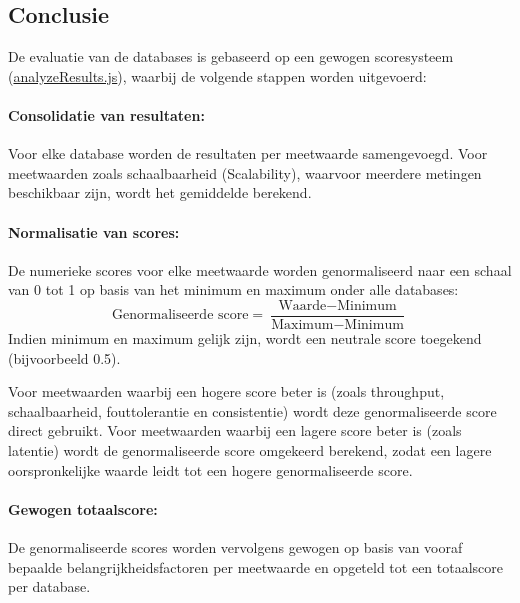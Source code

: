 \subsection{Conclusie}
De evaluatie van de databases is gebaseerd op een gewogen scoresysteem (\href{https://github.com/WoutVC/bachelorproef2024/blob/main/proof_of_concept/backend/analyzeResults.js}{analyzeResults.js}), waarbij de volgende stappen worden uitgevoerd:

\paragraph{Consolidatie van resultaten:} 
Voor elke database worden de resultaten per meetwaarde samengevoegd. Voor meetwaarden zoals schaalbaarheid (Scalability), waarvoor meerdere metingen beschikbaar zijn, wordt het gemiddelde berekend.

\paragraph{Normalisatie van scores:} 
De numerieke scores voor elke meetwaarde worden genormaliseerd naar een schaal van 0 tot 1 op basis van het minimum en maximum onder alle databases:
\[
\text{Genormaliseerde score} = \frac{\text{Waarde} - \text{Minimum}}{\text{Maximum} - \text{Minimum}}
\]
Indien minimum en maximum gelijk zijn, wordt een neutrale score toegekend (bijvoorbeeld 0.5).

Voor meetwaarden waarbij een hogere score beter is (zoals throughput, schaalbaarheid, fouttolerantie en consistentie) wordt deze genormaliseerde score direct gebruikt. Voor meetwaarden waarbij een lagere score beter is (zoals latentie) wordt de genormaliseerde score omgekeerd berekend, zodat een lagere oorspronkelijke waarde leidt tot een hogere genormaliseerde score.

\paragraph{Gewogen totaalscore:} 
De genormaliseerde scores worden vervolgens gewogen op basis van vooraf bepaalde belangrijkheidsfactoren per meetwaarde en opgeteld tot een totaalscore per database.


